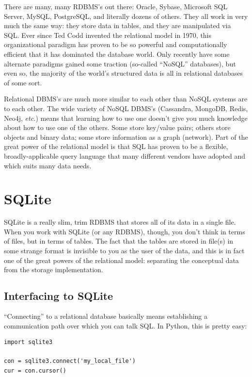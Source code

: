 There are many, many RDBMS's out there: Oracle, Sybase, Microsoft SQL Server,
MySQL, PostgreSQL, and literally dozens of others. They all work in very much
the same way: they store data in tables, and they are manipulated via SQL.
Ever since Ted Codd invented the relational model in 1970, this organizational
paradigm has proven to be so powerful and computationally efficient that it
has dominated the database world. Only recently have some alternate paradigms
gained some traction (so-called ``NoSQL'' databases), but even so, the majority
of the world's structured data is all in relational databases of some sort.

Relational DBMS's are much more similar to each other than NoSQL systems are
to each other. The wide variety of NoSQL DBMS's (Cassandra, MongoDB, Redis,
Neo4j, \textit{etc.}) means that learning how to use one doesn't give you much
knowledge about how to use one of the others. Some store key/value pairs;
others store objects and binary data; some store information as a graph
(network). Part of the great power of the relational model is that SQL has
proven to be a flexible, broadly-applicable query language that many different
vendors have adopted and which suits many data needs.

\section{SQLite}

SQLite is a really slim, trim RDBMS that stores all of its data in a single
file. When you work with SQLite (or any RDBMS), though, you don't think in
terms of files, but in terms of tables. The fact that the tables are stored in
file(s) in some strange format is invisible to you as the user of the data,
and this is in fact one of the great powers of the relational model:
separating the conceptual data from the storage implementation.

\subsection{Interfacing to SQLite}

``Connecting'' to a relational database basically means establishing a
communication path over which you can talk SQL. In Python, this is pretty
easy:

\begin{Verbatim}[fontsize=\small,samepage=true,frame=single]
import sqlite3

con = sqlite3.connect('my_local_file')
cur = con.cursor()
\end{Verbatim}

